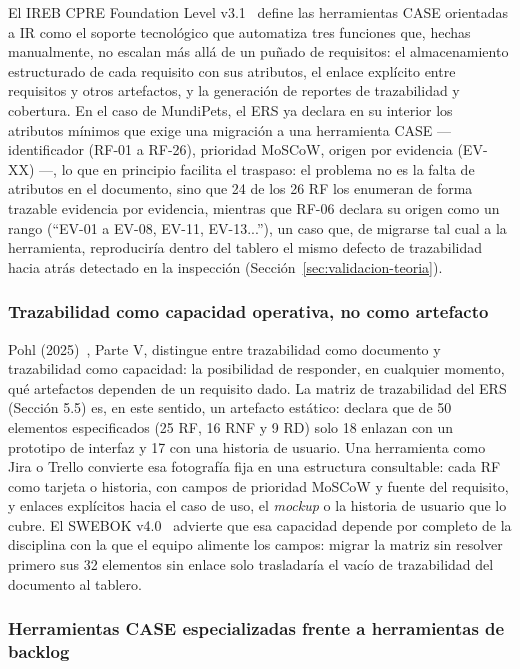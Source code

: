 \documentclass[journal,onecolumn]{IEEEtran}
\begin{document}
	El IREB CPRE Foundation Level v3.1~\cite{ireb_v31} define las
	herramientas CASE orientadas a IR como el soporte tecnológico que
	automatiza tres funciones que, hechas manualmente, no escalan más
	allá de un puñado de requisitos: el almacenamiento estructurado de
	cada requisito con sus atributos, el enlace explícito entre
	requisitos y otros artefactos, y la generación de reportes de
	trazabilidad y cobertura. En el caso de MundiPets, el ERS ya
	declara en su interior los atributos mínimos que exige una
	migración a una herramienta CASE --- identificador (RF-01 a
	RF-26), prioridad MoSCoW, origen por evidencia (EV-XX) ---, lo que
	en principio facilita el traspaso: el problema no es la falta de
	atributos en el documento, sino que 24 de los 26 RF los enumeran
	de forma trazable evidencia por evidencia, mientras que RF-06
	declara su origen como un rango (``EV-01 a EV-08, EV-11,
	EV-13...''), un caso que, de migrarse tal cual a la herramienta,
	reproduciría dentro del tablero el mismo defecto de trazabilidad
	hacia atrás detectado en la inspección
	(Sección~\ref{sec:validacion-teoria}).
	
	\subsubsection{Trazabilidad como capacidad operativa, no como artefacto}
	
	Pohl (2025)~\cite{pohl2025}, Parte V, distingue entre trazabilidad
	como documento y trazabilidad como capacidad: la posibilidad de
	responder, en cualquier momento, qué artefactos dependen de un
	requisito dado. La matriz de trazabilidad del ERS (Sección 5.5)
	es, en este sentido, un artefacto estático: declara que de 50
	elementos especificados (25 RF, 16 RNF y 9 RD) solo 18 enlazan con
	un prototipo de interfaz y 17 con una historia de usuario. Una
	herramienta como Jira o Trello convierte esa fotografía fija en
	una estructura consultable: cada RF como tarjeta o historia, con
	campos de prioridad MoSCoW y fuente del requisito, y enlaces
	explícitos hacia el caso de uso, el \emph{mockup} o la historia de
	usuario que lo cubre. El SWEBOK v4.0~\cite{swebok2024} advierte
	que esa capacidad depende por completo de la disciplina con la que
	el equipo alimente los campos: migrar la matriz sin resolver
	primero sus 32 elementos sin enlace solo trasladaría el vacío de
	trazabilidad del documento al tablero.
	
	\subsubsection{Herramientas CASE especializadas frente a herramientas de backlog}
	
\end{document}
